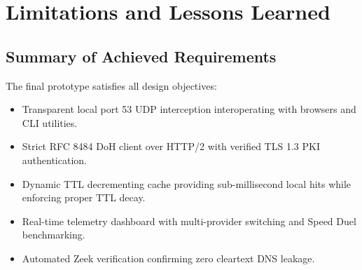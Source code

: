 \documentclass[10pt,a4paper]{article}
\begin{document}
\section{Limitations and Lessons Learned}

\subsection{Summary of Achieved Requirements}
The final prototype satisfies all design objectives:
\begin{itemize}\itemsep 1pt
    \item Transparent local port 53 UDP interception interoperating with browsers and CLI utilities.
    \item Strict RFC 8484 DoH client over HTTP/2 with verified TLS 1.3 PKI authentication.
    \item Dynamic TTL decrementing cache providing sub-millisecond local hits while enforcing proper TTL decay.
    \item Real-time telemetry dashboard with multi-provider switching and Speed Duel benchmarking.
    \item Automated Zeek verification confirming zero cleartext DNS leakage.
\end{itemize}
\end{document}
